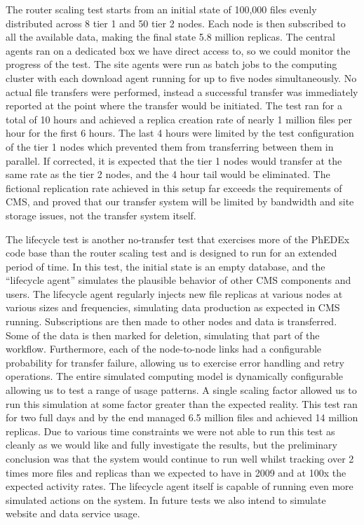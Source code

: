\documentclass{PoS}
\begin{document}
The router scaling test starts from an initial state of 100,000 files
evenly distributed across 8 tier 1 and 50 tier 2 nodes.  Each node is
then subscribed to all the available data, making the final state 5.8
million replicas.  The central agents ran on a dedicated box we have
direct access to, so we could monitor the progress of the test.  The
site agents were run as batch jobs to the computing cluster with each
download agent running for up to five nodes simultaneously.  No actual
file transfers were performed, instead a successful transfer was
immediately reported at the point where the transfer would be
initiated.  The test ran for a total of 10 hours and achieved a
replica creation rate of nearly 1 million files per hour for the first
6 hours.  The last 4 hours were limited by the test configuration of
the tier 1 nodes which prevented them from transferring between them
in parallel.  If corrected, it is expected that the tier 1 nodes would
transfer at the same rate as the tier 2 nodes, and the 4 hour tail
would be eliminated.  The fictional replication rate achieved in this
setup far exceeds the requirements of CMS, and proved that our
transfer system will be limited by bandwidth and site storage issues,
not the transfer system itself.

The lifecycle test is another no-transfer test that exercises more of
the PhEDEx code base than the router scaling test and is designed to
run for an extended period of time.  In this test, the initial state
is an empty database, and the ``lifecycle agent'' simulates the
plausible behavior of other CMS components and users.  The lifecycle
agent regularly injects new file replicas at various nodes at various
sizes and frequencies, simulating data production as expected in CMS
running.  Subscriptions are then made to other nodes and data is
transferred.  Some of the data is then marked for deletion, simulating
that part of the workflow.  Furthermore, each of the node-to-node
links had a configurable probability for transfer failure, allowing us
to exercise error handling and retry operations.  The entire simulated
computing model is dynamically configurable allowing us to test a
range of usage patterns.  A single scaling factor allowed us to run
this simulation at some factor greater than the expected reality.
This test ran for two full days and by the end managed 6.5 million
files and achieved 14 million replicas.  Due to various time
constraints we were not able to run this test as cleanly as we would
like and fully investigate the results, but the preliminary conclusion
was that the system would continue to run well whilst tracking over 2
times more files and replicas than we expected to have in 2009 and at
100x the expected activity rates.  The lifecycle agent itself is
capable of running even more simulated actions on the system.  In
future tests we also intend to simulate website and data service
usage.
\end{document}
